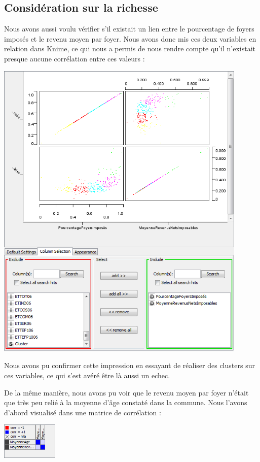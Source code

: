\subsection{Considération sur la richesse}

Nous avons aussi voulu vérifier s'il existait un lien entre le pourcentage de foyers imposés et le revenu moyen par foyer. Nous avons donc mis ces deux variables en relation dans Knime, ce qui nous a permis de nous rendre compte qu'il n'existait presque aucune corrélation entre ces valeurs :

\begin{center}
	\includegraphics[width=0.9\textwidth]{png/pourcentage-foyers-imposable-vs-revenu.png}
\end{center}

Nous avons pu confirmer cette impression en essayant de réaliser des clusters sur ces variables, ce qui s'est avéré être là aussi un echec.

De la même manière, nous avons pu voir que le revenu moyen par foyer n'était que très peu relié à la moyenne d'âge constaté dans la commune. Nous l'avons d'abord visualisé dans une matrice de corrélation :

\begin{center}
	\includegraphics[width=0.2\textwidth]{png/matrice-correlation-age-revenu.png}
\end{center}

